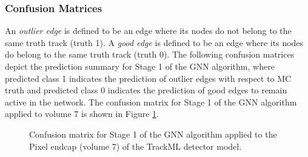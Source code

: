 
\subsubsection{Confusion Matrices}
An \textit{outlier edge} is defined to be an edge where its nodes do not belong to the same truth track (truth 1). A \textit{good edge} is defined to be an edge where its nodes do belong to the same truth track (truth 0). The following confusion matrices depict the prediction summary for Stage 1 of the GNN algorithm, where predicted class 1 indicates the prediction of outlier edges with respect to MC truth and predicted class 0 indicates the prediction of good edges to remain active in the network. The confusion matrix for Stage 1 of the GNN algorithm applied to volume 7 is shown in Figure \ref{fig:confusion-matrix-endcap-stage-1}.

\begin{figure}[htbp]%
    \centering
    \caption{Confusion matrix for Stage 1 of the GNN algorithm applied to the Pixel endcap (volume 7) of the TrackML detector model.}
    \label{fig:confusion-matrix-endcap-stage-1}
\end{figure}

